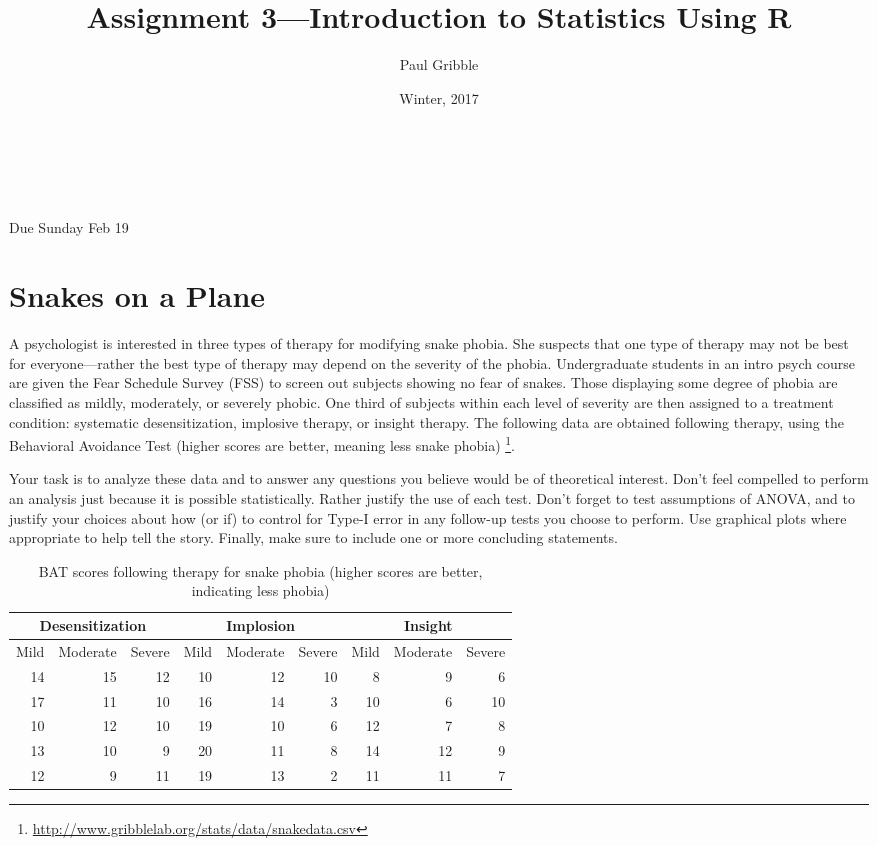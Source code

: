 \documentclass[10pt]{article}
\title{Assignment 3---Introduction to Statistics Using R}
\author{Paul Gribble}
\date{Winter, 2017}
\makeatletter
\renewcommand{\maketitle}{
\begin{flushleft}          %
{\Large\sffamily\bfseries\@title}   %
\vspace{3ex}\\            %
{\normalsize\sffamily\@author}           %
\vspace{0ex}\\             %
\normalsize\sffamily\@date                     %
\vspace{5ex}              %
\end{flushleft}
}
\makeatother
\begin{document}
\maketitle

\thispagestyle{empty}

{\flushleft \sffamily * Due Sunday Feb 19}

\section*{Snakes on a Plane}

A psychologist is interested in three types of therapy for modifying
snake phobia. She suspects that one type of therapy may not be best
for everyone---rather the best type of therapy may depend on the
severity of the phobia. Undergraduate students in an intro psych
course are given the Fear Schedule Survey (FSS) to screen out subjects
showing no fear of snakes. Those displaying some degree of phobia are
classified as mildly, moderately, or severely phobic. One third of
subjects within each level of severity are then assigned to a
treatment condition: systematic desensitization, implosive therapy, or
insight therapy. The following data are obtained following therapy,
using the Behavioral Avoidance Test (higher scores are better, meaning
less snake phobia)
\footnote{\url{http://www.gribblelab.org/stats/data/snakedata.csv}}.

Your task is to analyze these data and to answer any questions you
believe would be of theoretical interest. Don't feel compelled to
perform an analysis just because it is possible statistically. Rather
justify the use of each test. Don't forget to test assumptions of
ANOVA, and to justify your choices about how (or if) to control for
Type-I error in any follow-up tests you choose to perform. Use graphical plots
where appropriate to help tell the story. Finally, make sure to include one or more
concluding statements.

\begin{table}[h]
  \begin{center}
    \begin{tabular}{|rrr|rrr|rrr|}
      \hline
      \multicolumn{3}{|c|}{Desensitization} &\multicolumn{3}{|c|}{Implosion} &\multicolumn{3}{|c|}{Insight} \\
      \hline
      Mild & Moderate & Severe & Mild & Moderate & Severe & Mild & Moderate & Severe \\
      14 & 15 & 12 & 10 & 12 & 10 &  8 & 9  &  6 \\
      17 & 11 & 10 & 16 & 14 &  3 & 10 & 6  & 10 \\
      10 & 12 & 10 & 19 & 10 &  6 & 12 & 7  &  8 \\
      13 & 10 &  9 & 20 & 11 &  8 & 14 & 12 &  9 \\
      12 &  9 & 11 & 19 & 13 &  2 & 11 & 11 &  7 \\
      \hline
      \end{tabular}
      \caption{BAT scores following therapy for snake phobia (higher scores are better, indicating less phobia)}
      \label{ass5data}
      \end{center}
\end{table}
\end{document}
